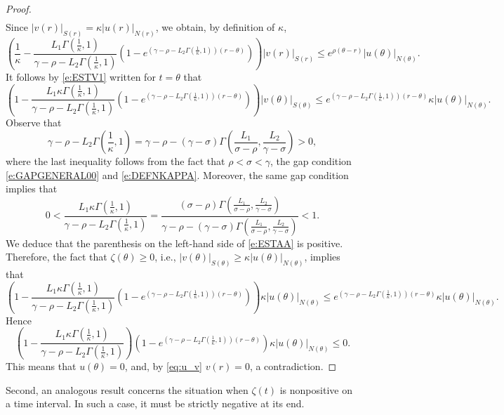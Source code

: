 \documentclass[a4paper,11pt,reqno]{amsart}
\theoremstyle{plain}
\theoremstyle{definition}
\numberwithin{equation}{section}
\renewcommand{\geq}{\geqslant}
\renewcommand{\leq}{\leqslant}
\begin{document}
\begin{proof}
\begin{align*}
\end{align*}
Since $|v(r)|_{S(r)}=\kappa|u(r)|_{N(r)}$, we obtain, by definition of $\kappa$, 
\begin{equation}\label{eq:u_v}
\left(\frac{1}{\kappa}-\frac{L_1\Gamma\left(\frac{1}{\kappa},1\right)}{\gamma-\rho-L_2\Gamma\left(\frac{1}{\kappa},1\right)}\left(1-e^{\left(\gamma-\rho-L_2\Gamma\left(\frac{1}{\kappa},1\right)\right)(r-\theta)}\right)\right)|v(r)|_{S(r)} \leq e^{\rho(\theta-r)}|u(\theta)|_{N(\theta)}.
\end{equation}
It follows by \eqref{e:ESTV1} written for $t=\theta$ that 
\begin{equation}\label{e:ESTAA}
\left(1-\frac{L_1\kappa \Gamma\left(\frac{1}{\kappa},1\right)}{\gamma-\rho-L_2\Gamma\left(\frac{1}{\kappa},1\right)}\left(1-e^{\left(\gamma-\rho-L_2\Gamma\left(\frac{1}{\kappa},1\right)\right)(r-\theta)}\right)\right)|v(\theta)|_{S(\theta)} \leq e^{\left(\gamma-\rho-L_2\Gamma\left(\frac{1}{\kappa},1\right)\right)(r-\theta)}\kappa |u(\theta)|_{N(\theta)}.
\end{equation}
Observe that
$$
\gamma-\rho-L_2\Gamma\left(\frac{1}{\kappa},1\right) = \gamma-\rho - (\gamma-\sigma)\Gamma\left(\frac{L_1}{\sigma-\rho},\frac{L_2}{\gamma-\sigma}\right) >0,
$$
where the last inequality follows from the fact that $\rho<\sigma<\gamma$, the gap condition \eqref{e:GAPGENERAL00} and \eqref{e:DEFNKAPPA}. Moreover, the same gap condition implies that
$$
0<\frac{L_1\kappa \Gamma\left(\frac{1}{\kappa},1\right)}{\gamma-\rho-L_2\Gamma\left(\frac{1}{\kappa},1\right)} = \frac{(\sigma-\rho)\Gamma\left(\frac{L_1}{\sigma-\rho},\frac{L_2}{\gamma-\sigma}\right)}{\gamma-\rho-(\gamma-\sigma)\Gamma\left(\frac{L_1}{\sigma-\rho},\frac{L_2}{\gamma-\sigma}\right)} < 1.
$$
We deduce that the parenthesis on the left-hand side of \eqref{e:ESTAA} is positive. Therefore, the fact that $\zeta(\theta)\geq 0$, i.e., $|v(\theta)|_{S(\theta)}\geq \kappa |u(\theta)|_{N(\theta)}$, implies that
$$
\left(1-\frac{L_1\kappa \Gamma\left(\frac{1}{\kappa},1\right)}{\gamma-\rho-L_2\Gamma\left(\frac{1}{\kappa},1\right)}\left(1-e^{\left(\gamma-\rho-L_2\Gamma\left(\frac{1}{\kappa},1\right)\right)(r-\theta)}\right)\right)\kappa|u(\theta)|_{N(\theta)} \leq e^{\left(\gamma-\rho-L_2\Gamma\left(\frac{1}{\kappa},1\right)\right)(r-\theta)}\kappa |u(\theta)|_{N(\theta)}.
$$
Hence
$$
\left(1-\frac{L_1\kappa \Gamma\left(\frac{1}{\kappa},1\right)}{\gamma-\rho-L_2\Gamma\left(\frac{1}{\kappa},1\right)}\right)\left(1-e^{\left(\gamma-\rho-L_2\Gamma\left(\frac{1}{\kappa},1\right)\right)(r-\theta)}\right)\kappa|u(\theta)|_{N(\theta)} \leq 0.
$$
This means that $u(\theta)=0$, and, by \eqref{eq:u_v} $v(r)=0$, a contradiction. 
\end{proof}
Second, an analogous result concerns the situation when $\zeta(t)$ is nonpositive on a time interval. In such a case, it must be strictly negative at its end. 
\end{document}
